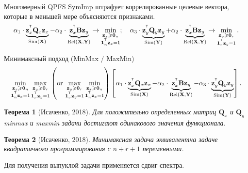 \documentclass[9pt]{beamer}
\renewcommand{\geq}{\ensuremath{\geqslant}}
\newcommand{\bz}{\mathbf{z}}
\newcommand{\bB}{\mathbf{B}}
\newcommand{\bQ}{\mathbf{Q}}
\newcommand{\bX}{\mathbf{X}}
\newcommand{\bY}{\mathbf{Y}}
\newcommand{\T}{^{\text{\tiny\sffamily\upshape\mdseries T}}}
\newcommand{\bOne}{\boldsymbol{1}}
\newcommand{\bZero}{\boldsymbol{0}}
\newtheorem{rustheorem}{Теорема}
\begin{document}
\begin{frame}{Многомерный QPFS}
	SymImp штрафует коррелированные целевые вектора, которые в меньшей мере объясняются признаками. 
	\[
	\alpha_1 \cdot \underbrace{\bz_x^{\T} \bQ_x \bz_x}_{\text{Sim}(\bX)} - \alpha_2 \cdot \underbrace{\vphantom{()} \bz_x^{\T}\mathbf{B} \bz_y}_{\text{Rel}(\bX, \bY)} \rightarrow \min_{\substack{\bz_x \geq \bZero_n \\ \bOne_n^{\T}\bz_x=1}}; \quad
	\alpha_3 \cdot \underbrace{\bz_y^{\T} \bQ_y \bz_y}_{\text{Sim}(\bY)} + \alpha_2 \cdot \underbrace{\vphantom{()} \bz_x^{\T} \mathbf{B} \bz_y}_{\text{Rel}(\bX, \bY)} \rightarrow \min_{\substack{\bz_y \geq \bZero_r  \\ \bOne_r^{\T}\bz_y=1}}.
	\]
	\vspace{-0.2cm}
	\begin{block}{Минимаксный подход (MinMax / MaxMin)}
	\vspace{-0.5cm}
	\[
	\min_{\substack{\bz_x \geq \bZero_n \\ \bOne_n^{\T}\bz_x=1}} 	\max_{\substack{\bz_y \geq \bZero_r \\ \bOne_r^{\T}\bz_y=1}} \left(\text {or} \, \max_{\substack{\bz_y \geq \bZero_r \\ \bOne_r^{\T}\bz_y=1}} \min_{\substack{\bz_x \geq \bZero_n \\ \bOne_n^{\T}\bz_x=1}}\right) \left[\alpha_1 \cdot \underbrace{\bz_x^{\T} \bQ_x \bz_x}_{\text{Sim}(\bX)} - \alpha_2 \cdot \underbrace{\bz_x^{\T} \bB \bz_y}_{\text{Rel}(\bX, \bY)} - \alpha_3 \cdot \underbrace{\bz_y^{\T} \bQ_y \bz_y}_{\text{Sim}(\bY)}\right].
	\]
	\end{block}
	\vspace{-0.4cm}
	\begin{rustheorem}[Исаченко, 2018]
		Для положительно определенных матриц $\bQ_x$ и $\bQ_y$ minmax и maxmin задачи достигают одинакового значения функционала.
	\end{rustheorem}
	\vspace{-0.2cm}
	\begin{rustheorem}[Исаченко, 2018]
		Минимаксная задача эквивалентна задаче квадратичного программирования с $n + r + 1$ переменными.
	\end{rustheorem}
	Для получения выпуклой задачи применяется сдвиг спектра.

\end{frame}
\end{document}
